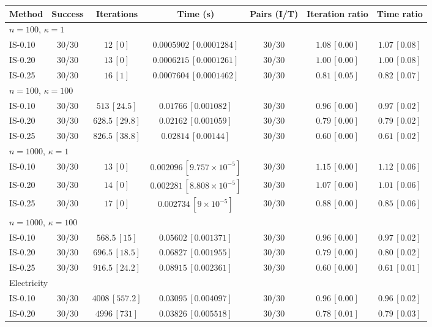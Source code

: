 \begin{tabular}{lcccccc}
\toprule
Method & Success & Iterations & Time (s) & Pairs (I/T) & Iteration ratio & Time ratio \\
\midrule
\multicolumn{7}{l}{$n=100$, $\kappa=1$} \\
IS-0.10 & 30/30 & $12\, [0]$ & $0.0005902\, [0.0001284]$ & 30/30 & $1.08\, [0.00]$ & $1.07\, [0.08]$ \\
IS-0.20 & 30/30 & $13\, [0]$ & $0.0006215\, [0.0001261]$ & 30/30 & $1.00\, [0.00]$ & $1.00\, [0.08]$ \\
IS-0.25 & 30/30 & $16\, [1]$ & $0.0007604\, [0.0001462]$ & 30/30 & $0.81\, [0.05]$ & $0.82\, [0.07]$ \\
\midrule
\multicolumn{7}{l}{$n=100$, $\kappa=100$} \\
IS-0.10 & 30/30 & $513\, [24.5]$ & $0.01766\, [0.001082]$ & 30/30 & $0.96\, [0.00]$ & $0.97\, [0.02]$ \\
IS-0.20 & 30/30 & $628.5\, [29.8]$ & $0.02162\, [0.001059]$ & 30/30 & $0.79\, [0.00]$ & $0.79\, [0.02]$ \\
IS-0.25 & 30/30 & $826.5\, [38.8]$ & $0.02814\, [0.00144]$ & 30/30 & $0.60\, [0.00]$ & $0.61\, [0.02]$ \\
\midrule
\multicolumn{7}{l}{$n=1000$, $\kappa=1$} \\
IS-0.10 & 30/30 & $13\, [0]$ & $0.002096\, [9.757\times10^{-5}]$ & 30/30 & $1.15\, [0.00]$ & $1.12\, [0.06]$ \\
IS-0.20 & 30/30 & $14\, [0]$ & $0.002281\, [8.808\times10^{-5}]$ & 30/30 & $1.07\, [0.00]$ & $1.01\, [0.06]$ \\
IS-0.25 & 30/30 & $17\, [0]$ & $0.002734\, [9\times10^{-5}]$ & 30/30 & $0.88\, [0.00]$ & $0.85\, [0.06]$ \\
\midrule
\multicolumn{7}{l}{$n=1000$, $\kappa=100$} \\
IS-0.10 & 30/30 & $568.5\, [15]$ & $0.05602\, [0.001371]$ & 30/30 & $0.96\, [0.00]$ & $0.97\, [0.02]$ \\
IS-0.20 & 30/30 & $696.5\, [18.5]$ & $0.06827\, [0.001955]$ & 30/30 & $0.79\, [0.00]$ & $0.80\, [0.02]$ \\
IS-0.25 & 30/30 & $916.5\, [24.2]$ & $0.08915\, [0.002361]$ & 30/30 & $0.60\, [0.00]$ & $0.61\, [0.01]$ \\
\midrule
\multicolumn{7}{l}{Electricity} \\
IS-0.10 & 30/30 & $4008\, [557.2]$ & $0.03095\, [0.004097]$ & 30/30 & $0.96\, [0.00]$ & $0.96\, [0.02]$ \\
IS-0.20 & 30/30 & $4996\, [731]$ & $0.03826\, [0.005518]$ & 30/30 & $0.78\, [0.01]$ & $0.79\, [0.03]$ \\

\end{tabular}
